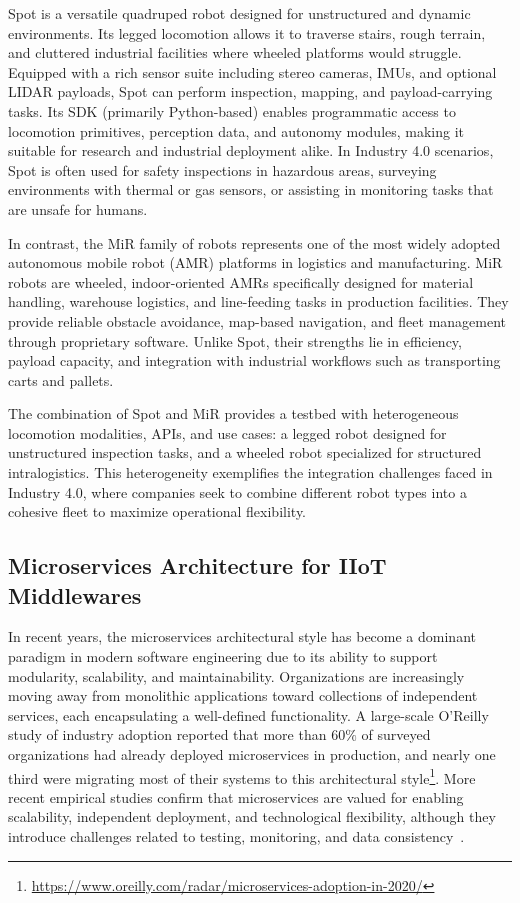 \documentclass[conference]{IEEEtran}
\begin{document}
Spot is a versatile quadruped robot designed for unstructured and dynamic environments. 
%
Its legged locomotion allows it to traverse stairs, rough terrain, 
 and cluttered industrial facilities where wheeled platforms would struggle. 
% 
Equipped with a rich sensor suite including stereo cameras, IMUs, and optional LIDAR payloads, 
 Spot can perform inspection, mapping, and payload-carrying tasks. 
% 
Its SDK (primarily Python-based) enables programmatic access to locomotion primitives, perception data, 
 and autonomy modules, making it suitable for research and industrial deployment alike. 
% 
In Industry 4.0 scenarios, Spot is often used for safety inspections in hazardous areas, 
 surveying environments with thermal or gas sensors, 
 or assisting in monitoring tasks that are unsafe for humans.

In contrast, the MiR family of robots represents one of the most widely adopted 
 autonomous mobile robot (AMR) platforms in logistics and manufacturing.
%
MiR robots are wheeled, indoor-oriented AMRs specifically designed for material handling, warehouse logistics, 
 and line-feeding tasks in production facilities. 
% 
They provide reliable obstacle avoidance, map-based navigation, 
 and fleet management through proprietary software. 
% 
Unlike Spot, their strengths lie in efficiency, payload capacity, and integration 
 with industrial workflows such as transporting carts and pallets.

The combination of Spot and MiR provides a testbed with heterogeneous 
 locomotion modalities, APIs, and use cases: 
  a legged robot designed for unstructured inspection tasks, 
  and a wheeled robot specialized for structured intralogistics. 
%
This heterogeneity exemplifies the integration challenges faced in Industry 4.0, 
 where companies seek to combine different robot types into a cohesive fleet 
 to maximize operational flexibility.

\subsection{Microservices Architecture for IIoT Middlewares}
In recent years, 
 the microservices architectural style has become a dominant paradigm in modern software engineering 
  due to its ability to support modularity, scalability, and maintainability. 
%  
Organizations are increasingly moving away from monolithic applications toward collections of independent services, 
 each encapsulating a well-defined functionality.
 A large-scale O'Reilly study of industry adoption reported that more than $60\%$ 
  of surveyed organizations had already deployed microservices in production, 
  and nearly one third were migrating most of their systems to this architectural 
  style\footnote{\url{https://www.oreilly.com/radar/microservices-adoption-in-2020/}}. 
%  
More recent empirical studies confirm that microservices are valued for enabling scalability, 
 independent deployment, and technological flexibility, although they introduce challenges related to 
 testing, monitoring, and data consistency~\cite{nogueira2024icsm}.
\end{document}
